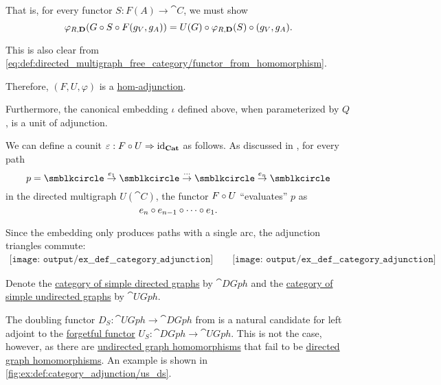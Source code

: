 \begin{example}
\begin{thmenum}
    That is, for every functor \( S: F(A) \to \cat{C} \), we must show
    \begin{equation*}
      \varphi_{R, \cat{D}}(G \bincirc S \bincirc F(g_V, g_A))
      =
      U(G) \bincirc \varphi_{R, \cat{D}}(S) \bincirc (g_V, g_A).
    \end{equation*}

    This is also clear from \eqref{eq:def:directed_multigraph_free_category/functor_from_homomorphism}.

    Therefore, \( (F, U, \varphi) \) is a \hyperref[def:category_adjunction/hom]{hom-adjunction}.

    Furthermore, the canonical embedding \( \iota \) defined above, when parameterized by \( Q \), is a unit of adjunction.

    We can define a counit \( \varepsilon: F \bincirc U \Rightarrow \id_{\cat{Cat}} \) as follows. As discussed in , for every path
    \begin{equation*}
      p = \anon \overset {e_1} \to \anon \overset \cdots \to \anon \overset {e_n} \to \anon
    \end{equation*}
    in the directed multigraph \( U(\cat{C}) \), the functor \( F \bincirc U \) \enquote{evaluates} \( p \) as
    \begin{equation*}
      e_n \bincirc e_{n-1} \bincirc \cdots \bincirc e_1.
    \end{equation*}

    Since the embedding only produces paths with a single arc, the adjunction triangles commute:
    \begin{equation}\label{eq:ex:def:category_adjunction/dm_cat/triangles}
      \begin{aligned}
        \texttt{[image: output/ex\_\_def\_\_category\_adjunction]}
        \quad\quad
        \texttt{[image: output/ex\_\_def\_\_category\_adjunction]}
      \end{aligned}
    \end{equation}

     Denote the \hyperref[def:directed_graph/category]{category of simple directed graphs} by \( \cat{DGph} \) and the \hyperref[def:directed_graph/category]{category of simple undirected graphs} by \( \cat{UGph} \).

    The doubling functor \( D_S: \cat{UGph} \to \cat{DGph} \) from  is a natural candidate for left adjoint to the \hyperref[def:concrete_category]{forgetful functor} \hyperref[def:graph_functors/simple_forgetful]{\( U_S: \cat{DGph} \to \cat{UGph} \)}. This is not the case, however, as there are \hyperref[def:hypergraph/homomorphism]{undirected graph homomorphisms} that fail to be \hyperref[def:directed_multigraph/homomorphism]{directed graph homomorphisms}. An example is shown in \cref{fig:ex:def:category_adjunction/us_ds}.


\end{thmenum}
\end{example}
